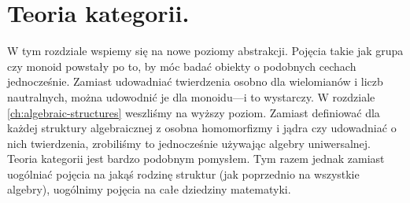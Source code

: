 \chapter{Teoria kategorii.}

W tym rozdziale wspiemy się na nowe poziomy abstrakcji.
Pojęcia takie jak grupa czy monoid powstały po to,
	by móc badać obiekty o podobnych cechach jednocześnie.
Zamiast udowadniać twierdzenia osobno dla wielomianów i liczb nautralnych,
	można udowodnić je dla monoidu---i to wystarczy.
W rozdziale \ref{ch:algebraic-structures} weszliśmy na wyższy poziom.
Zamiast definiować dla każdej struktury algebraicznej z osobna
	homomorfizmy i jądra czy udowadniać o nich twierdzenia,
	zrobiliśmy to jednocześnie używając algebry uniwersalnej.
Teoria kategorii jest bardzo podobnym pomysłem.
Tym razem jednak zamiast uogólniać pojęcia na jakąś rodzinę struktur (jak poprzednio na wszystkie algebry),
	uogólnimy pojęcia na całe dziedziny matematyki.






